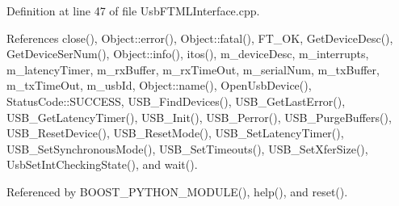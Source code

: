 Definition at line 47 of file Usb\+F\+T\+M\+L\+Interface.\+cpp.



References close(), Object\+::error(), Object\+::fatal(), F\+T\+\_\+\+OK, Get\+Device\+Desc(), Get\+Device\+Ser\+Num(), Object\+::info(), itos(), m\+\_\+device\+Desc, m\+\_\+interrupts, m\+\_\+latency\+Timer, m\+\_\+rx\+Buffer, m\+\_\+rx\+Time\+Out, m\+\_\+serial\+Num, m\+\_\+tx\+Buffer, m\+\_\+tx\+Time\+Out, m\+\_\+usb\+Id, Object\+::name(), Open\+Usb\+Device(), Status\+Code\+::\+S\+U\+C\+C\+E\+SS, U\+S\+B\+\_\+\+Find\+Devices(), U\+S\+B\+\_\+\+Get\+Last\+Error(), U\+S\+B\+\_\+\+Get\+Latency\+Timer(), U\+S\+B\+\_\+\+Init(), U\+S\+B\+\_\+\+Perror(), U\+S\+B\+\_\+\+Purge\+Buffers(), U\+S\+B\+\_\+\+Reset\+Device(), U\+S\+B\+\_\+\+Reset\+Mode(), U\+S\+B\+\_\+\+Set\+Latency\+Timer(), U\+S\+B\+\_\+\+Set\+Synchronous\+Mode(), U\+S\+B\+\_\+\+Set\+Timeouts(), U\+S\+B\+\_\+\+Set\+Xfer\+Size(), Usb\+Set\+Int\+Checking\+State(), and wait().



Referenced by B\+O\+O\+S\+T\+\_\+\+P\+Y\+T\+H\+O\+N\+\_\+\+M\+O\+D\+U\+L\+E(), help(), and reset().


